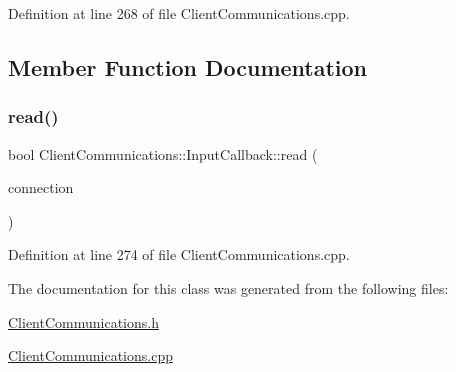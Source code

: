 Definition at line 268 of file Client\+Communications.\+cpp.



\subsection{Member Function Documentation}
\hypertarget{classocra__recipes_1_1ClientCommunications_1_1InputCallback_ac35b3e10d832570b5559afd89d1a58c5}{}\label{classocra__recipes_1_1ClientCommunications_1_1InputCallback_ac35b3e10d832570b5559afd89d1a58c5} 
\subsubsection{\texorpdfstring{read()}{read()}}
{\footnotesize\ttfamily bool Client\+Communications\+::\+Input\+Callback\+::read (\begin{DoxyParamCaption}\item[{yarp\+::os\+::\+Connection\+Reader \&}]{connection }\end{DoxyParamCaption})\hspace{0.3cm}{\ttfamily [virtual]}}



Definition at line 274 of file Client\+Communications.\+cpp.



The documentation for this class was generated from the following files\+:\begin{DoxyCompactItemize}
\item 
\hyperlink{ClientCommunications_8h}{Client\+Communications.\+h}\item 
\hyperlink{ClientCommunications_8cpp}{Client\+Communications.\+cpp}\end{DoxyCompactItemize}
